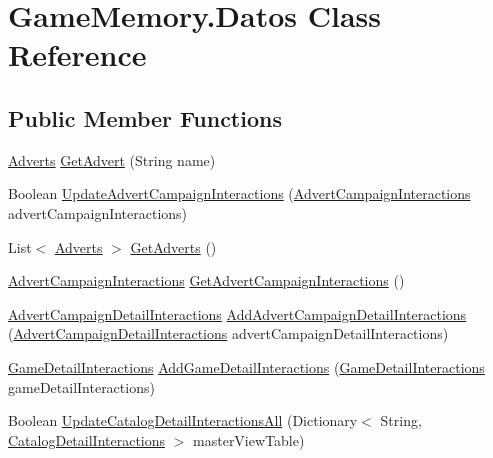 \hypertarget{class_game_memory_1_1_datos}{\section{Game\-Memory.\-Datos Class Reference}
\label{class_game_memory_1_1_datos}
}
\subsection*{Public Member Functions}
\begin{DoxyCompactItemize}
\item 
\hyperlink{class_game_memory_1_1_adverts}{Adverts} \hyperlink{class_game_memory_1_1_datos_a2e76de0c6baedc5fd26fb4e9ec3eedfe}{Get\-Advert} (String name)
\item 
Boolean \hyperlink{class_game_memory_1_1_datos_aa6db3d4b113ee4a5e2ef447a62a5bb2a}{Update\-Advert\-Campaign\-Interactions} (\hyperlink{class_game_memory_1_1_advert_campaign_interactions}{Advert\-Campaign\-Interactions} advert\-Campaign\-Interactions)
\item 
List$<$ \hyperlink{class_game_memory_1_1_adverts}{Adverts} $>$ \hyperlink{class_game_memory_1_1_datos_a453c1dc1dc586ff3b814857d0d805c0f}{Get\-Adverts} ()
\item 
\hyperlink{class_game_memory_1_1_advert_campaign_interactions}{Advert\-Campaign\-Interactions} \hyperlink{class_game_memory_1_1_datos_a9cd59d07c247460e24e1b8b1db5ead48}{Get\-Advert\-Campaign\-Interactions} ()
\item 
\hyperlink{class_game_memory_1_1_advert_campaign_detail_interactions}{Advert\-Campaign\-Detail\-Interactions} \hyperlink{class_game_memory_1_1_datos_a4acd5b97aef21b73b1162a77d8f34838}{Add\-Advert\-Campaign\-Detail\-Interactions} (\hyperlink{class_game_memory_1_1_advert_campaign_detail_interactions}{Advert\-Campaign\-Detail\-Interactions} advert\-Campaign\-Detail\-Interactions)
\item 
\hyperlink{class_game_memory_1_1_game_detail_interactions}{Game\-Detail\-Interactions} \hyperlink{class_game_memory_1_1_datos_adcf578b5010b961c9f73c40cc27c7f11}{Add\-Game\-Detail\-Interactions} (\hyperlink{class_game_memory_1_1_game_detail_interactions}{Game\-Detail\-Interactions} game\-Detail\-Interactions)
\item 
Boolean \hyperlink{class_game_memory_1_1_datos_a52ac5d5587b844ae7ced3354f9cca896}{Update\-Catalog\-Detail\-Interactions\-All} (Dictionary$<$ String, \hyperlink{class_game_memory_1_1_catalog_detail_interactions}{Catalog\-Detail\-Interactions} $>$ master\-View\-Table)

\end{DoxyCompactItemize}
